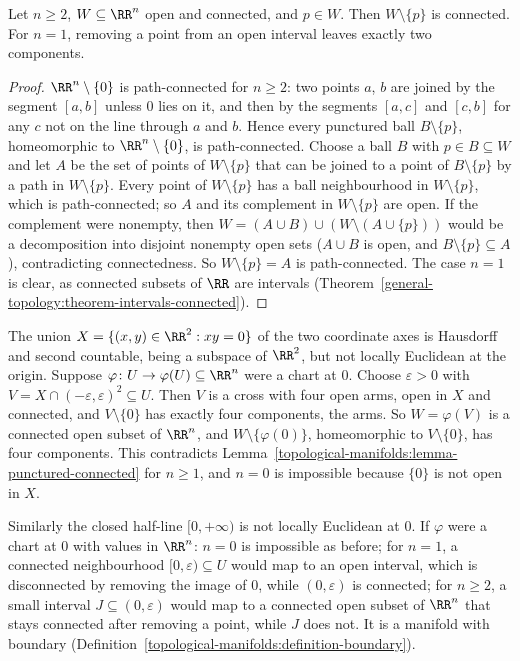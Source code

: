 \begin{lemma}\label{topological-manifolds:lemma-punctured-connected}
Let $n \geq 2$, $W \subseteq \RR^n$ open and connected, and $p \in W$. Then $W \setminus \{p\}$ is connected. For $n = 1$, removing a point from an open interval leaves exactly two components.
\end{lemma}

\begin{proof}
$\RR^n \setminus \{0\}$ is path-connected for $n \geq 2$: two points $a$, $b$ are joined by the segment $[a, b]$ unless $0$ lies on it, and then by the segments $[a, c]$ and $[c, b]$ for any $c$ not on the line through $a$ and $b$.
Hence every punctured ball $B \setminus \{p\}$, homeomorphic to $\RR^n \setminus \{0\}$, is path-connected. Choose a ball $B$ with $p \in B \subseteq W$ and let $A$ be the set of points of $W \setminus \{p\}$ that can be joined to a
point of $B \setminus \{p\}$ by a path in $W \setminus \{p\}$. Every point of $W \setminus \{p\}$ has a ball neighbourhood in $W \setminus \{p\}$, which is path-connected; so $A$ and its complement in $W \setminus \{p\}$ are open. If
the complement were nonempty, then $W = (A \cup B) \cup (W \setminus (A \cup \{p\}))$ would be a decomposition into disjoint nonempty open sets ($A \cup B$ is open, and $B \setminus \{p\} \subseteq A$), contradicting connectedness. So
$W \setminus \{p\} = A$ is path-connected. The case $n = 1$ is clear, as connected subsets of $\RR$ are intervals (Theorem~\ref{general-topology:theorem-intervals-connected}).
\end{proof}

\begin{counterexample}\label{topological-manifolds:counterexample-not-locally-euclidean}
The union $X = \{(x, y) \in \RR^2 : xy = 0\}$ of the two coordinate axes is Hausdorff and second countable, being a subspace of $\RR^2$, but not locally Euclidean at the origin. Suppose $\varphi \colon U \to \varphi(U) \subseteq \RR^n$ were a
chart at $0$. Choose $\varepsilon > 0$ with $V = X \cap (-\varepsilon, \varepsilon)^2 \subseteq U$. Then $V$ is a cross with four open arms, open in $X$ and connected, and $V \setminus \{0\}$ has exactly four components, the arms.
So $W = \varphi(V)$ is a connected open subset of $\RR^n$, and $W \setminus \{\varphi(0)\}$, homeomorphic to $V \setminus \{0\}$, has four components. This contradicts Lemma~\ref{topological-manifolds:lemma-punctured-connected} for
$n \geq 1$, and $n = 0$ is impossible because $\{0\}$ is not open in $X$.

Similarly the closed half-line $[0, +\infty)$ is not locally Euclidean at $0$. If $\varphi$ were a chart at $0$ with values in $\RR^n$: $n = 0$ is impossible as before; for $n = 1$, a connected neighbourhood $[0, \varepsilon) \subseteq U$
would map to an open interval, which is disconnected by removing the image of $0$, while $(0, \varepsilon)$ is connected; for $n \geq 2$, a small interval $J \subseteq (0, \varepsilon)$ would map to a connected open subset of $\RR^n$ that
stays connected after removing a point, while $J$ does not. It is a manifold with boundary (Definition~\ref{topological-manifolds:definition-boundary}).
\end{counterexample}

